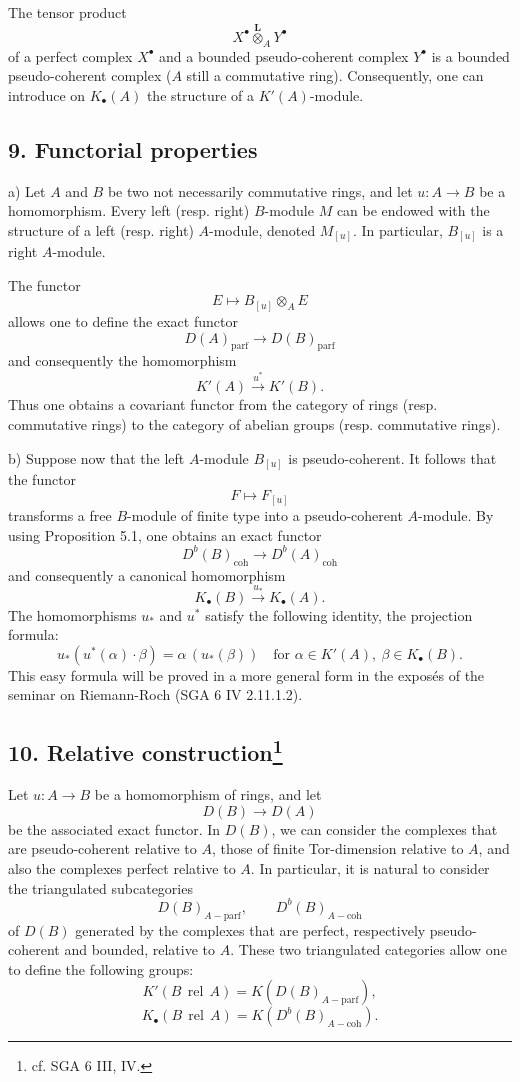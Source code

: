 \documentclass[11pt]{article}
\providecommand{\parf}{\mathrm{parf}}
\providecommand{\coh}{\mathrm{coh}}
\providecommand{\parf}{\mathrm{parf}}
\providecommand{\coh}{\mathrm{coh}}
\begin{document}
The tensor product
\[
X^\bullet\overset{\mathbf L}{\otimes}_A Y^\bullet
\]
of a perfect complex $X^\bullet$ and a bounded pseudo-coherent complex $Y^\bullet$ is a bounded pseudo-coherent complex ($A$ still a commutative ring). Consequently, one can introduce on $K_\bullet(A)$ the structure of a $K'(A)$-module.

\subsection*{9. Functorial properties}

a) Let $A$ and $B$ be two not necessarily commutative rings, and let $u:A\to B$ be a homomorphism. Every left (resp. right) $B$-module $M$ can be endowed with the structure of a left (resp. right) $A$-module, denoted $M_{[u]}$. In particular, $B_{[u]}$ is a right $A$-module.

The functor
\[
E\longmapsto B_{[u]}\otimes_A E
\]
allows one to define the exact functor
\[
D(A)_{\parf}\longrightarrow D(B)_{\parf}
\]
and consequently the homomorphism
\[
K'(A)\xrightarrow{u^*}K'(B).
\]
Thus one obtains a covariant functor from the category of rings (resp. commutative rings) to the category of abelian groups (resp. commutative rings).

b) Suppose now that the left $A$-module $B_{[u]}$ is pseudo-coherent. It follows that the functor
\[
F\longmapsto F_{[u]}
\]
transforms a free $B$-module of finite type into a pseudo-coherent $A$-module. By using Proposition 5.1, one obtains an exact functor
\[
D^b(B)_{\coh}\longrightarrow D^b(A)_{\coh}
\]
and consequently a canonical homomorphism
\[
K_\bullet(B)\xrightarrow{u_*}K_\bullet(A).
\]
The homomorphisms $u_*$ and $u^*$ satisfy the following identity, the projection formula:
\[
u_*(u^*(\alpha)\cdot \beta)=\alpha\,(u_*(\beta))
\quad\text{for }\alpha\in K'(A),\ \beta\in K_\bullet(B).
\]
This easy formula will be proved in a more general form in the exposés of the seminar on Riemann-Roch (SGA 6 IV 2.11.1.2).

\subsection*{10. Relative construction\footnote{cf. SGA 6 III, IV.}}

Let $u:A\to B$ be a homomorphism of rings, and let
\[
D(B)\longrightarrow D(A)
\]
be the associated exact functor. In $D(B)$, we can consider the complexes that are pseudo-coherent relative to $A$, those of finite Tor-dimension relative to $A$, and also the complexes perfect relative to $A$. In particular, it is natural to consider the triangulated subcategories
\[
D(B)_{A-\parf},\qquad D^b(B)_{A-\coh}
\]
of $D(B)$ generated by the complexes that are perfect, respectively pseudo-coherent and bounded, relative to $A$. These two triangulated categories allow one to define the following groups:
\[
K'(B\operatorname{\,rel\,}A)=K(D(B)_{A-\parf}),
\]
\[
K_\bullet(B\operatorname{\,rel\,}A)=K(D^b(B)_{A-\coh}).
\]
\end{document}
